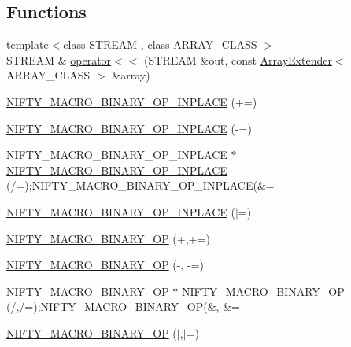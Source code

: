 \subsection*{Functions}
\begin{DoxyCompactItemize}
\item 
{\footnotesize template$<$class S\+T\+R\+E\+AM , class A\+R\+R\+A\+Y\+\_\+\+C\+L\+A\+SS $>$ }\\S\+T\+R\+E\+AM \& \hyperlink{namespacenifty_1_1array_ae3d01c9b4b4259a31ac35ce0a6cf3b48}{operator$<$$<$} (S\+T\+R\+E\+AM \&out, const \hyperlink{classnifty_1_1array_1_1ArrayExtender}{Array\+Extender}$<$ A\+R\+R\+A\+Y\+\_\+\+C\+L\+A\+SS $>$ \&array)
\item 
\hyperlink{namespacenifty_1_1array_a9cfe55e7ae08c0c0a43a6f27d18929d4}{N\+I\+F\+T\+Y\+\_\+\+M\+A\+C\+R\+O\+\_\+\+B\+I\+N\+A\+R\+Y\+\_\+\+O\+P\+\_\+\+I\+N\+P\+L\+A\+CE} (+=)
\item 
\hyperlink{namespacenifty_1_1array_a9f4f64ff2f9c1ab8afe746625ce8fbc9}{N\+I\+F\+T\+Y\+\_\+\+M\+A\+C\+R\+O\+\_\+\+B\+I\+N\+A\+R\+Y\+\_\+\+O\+P\+\_\+\+I\+N\+P\+L\+A\+CE} (-\/=)
\item 
N\+I\+F\+T\+Y\+\_\+\+M\+A\+C\+R\+O\+\_\+\+B\+I\+N\+A\+R\+Y\+\_\+\+O\+P\+\_\+\+I\+N\+P\+L\+A\+CE $\ast$ \hyperlink{namespacenifty_1_1array_a211ca8d1e02522fefe7608751e6420e3}{N\+I\+F\+T\+Y\+\_\+\+M\+A\+C\+R\+O\+\_\+\+B\+I\+N\+A\+R\+Y\+\_\+\+O\+P\+\_\+\+I\+N\+P\+L\+A\+CE} (/=);N\+I\+F\+T\+Y\+\_\+\+M\+A\+C\+R\+O\+\_\+\+B\+I\+N\+A\+R\+Y\+\_\+\+O\+P\+\_\+\+I\+N\+P\+L\+A\+CE(\&=
\item 
\hyperlink{namespacenifty_1_1array_a7b3793e9633aafbb149e77b4292d0a74}{N\+I\+F\+T\+Y\+\_\+\+M\+A\+C\+R\+O\+\_\+\+B\+I\+N\+A\+R\+Y\+\_\+\+O\+P\+\_\+\+I\+N\+P\+L\+A\+CE} ($\vert$=)
\item 
\hyperlink{namespacenifty_1_1array_adacdae329fa7ea377154bbc41717f86f}{N\+I\+F\+T\+Y\+\_\+\+M\+A\+C\+R\+O\+\_\+\+B\+I\+N\+A\+R\+Y\+\_\+\+OP} (+,+=)
\item 
\hyperlink{namespacenifty_1_1array_a70fec34e34b32501a7a24894c2658cf0}{N\+I\+F\+T\+Y\+\_\+\+M\+A\+C\+R\+O\+\_\+\+B\+I\+N\+A\+R\+Y\+\_\+\+OP} (-\/, -\/=)
\item 
N\+I\+F\+T\+Y\+\_\+\+M\+A\+C\+R\+O\+\_\+\+B\+I\+N\+A\+R\+Y\+\_\+\+OP $\ast$ \hyperlink{namespacenifty_1_1array_aa7253f406426ee08919c625db256f3c1}{N\+I\+F\+T\+Y\+\_\+\+M\+A\+C\+R\+O\+\_\+\+B\+I\+N\+A\+R\+Y\+\_\+\+OP} (/,/=);N\+I\+F\+T\+Y\+\_\+\+M\+A\+C\+R\+O\+\_\+\+B\+I\+N\+A\+R\+Y\+\_\+\+OP(\&, \&=
\item 
\hyperlink{namespacenifty_1_1array_adbe1f99691b0c07ecfb3d57a3ad3f194}{N\+I\+F\+T\+Y\+\_\+\+M\+A\+C\+R\+O\+\_\+\+B\+I\+N\+A\+R\+Y\+\_\+\+OP} ($\vert$,$\vert$=)
\end{DoxyCompactItemize}


